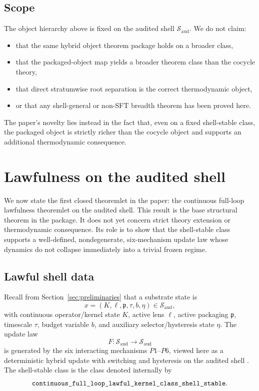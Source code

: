 \documentclass[11pt]{article}
\theoremstyle{definition}
\begin{document}
\subsection{Scope}

The object hierarchy above is fixed on the audited shell \(\mathcal{S}_{\mathrm{aud}}\). We do not claim:
\begin{itemize}
    \item that the same hybrid object theorem package holds on a broader class,
    \item that the packaged-object map yields a broader theorem class than the cocycle theory,
    \item that direct stratumwise root separation is the correct thermodynamic object,
    \item or that any shell-general or non-SFT breadth theorem has been proved here.
\end{itemize}
The paper’s novelty lies instead in the fact that, even on a fixed shell-stable class, the packaged object is strictly richer than the cocycle object and supports an additional thermodynamic consequence.
 \section{Lawfulness on the audited shell}\label{sec:lawfulness}

We now state the first closed theoremlet in the paper: the continuous full-loop lawfulness theoremlet on the audited shell. This result is the base structural theorem in the package. It does not yet concern strict theory extension or thermodynamic consequence. Its role is to show that the shell-stable class supports a well-defined, nondegenerate, six-mechanism update law whose dynamics do not collapse immediately into a trivial frozen regime.

\subsection{Lawful shell data}

Recall from Section~\ref{sec:preliminaries} that a substrate state is
\[
x=(K,\ell,\mathfrak{p},\tau,b,\eta)\in \mathcal{S}_{\mathrm{aud}},
\]
with continuous operator/kernel state \(K\), active lens \(\ell\), active packaging \(\mathfrak{p}\), timescale \(\tau\), budget variable \(b\), and auxiliary selector/hysteresis state \(\eta\). The update law
\[
F:\mathcal{S}_{\mathrm{aud}}\to \mathcal{S}_{\mathrm{aud}}
\]
is generated by the six interacting mechanisms \(P1\)--\(P6\), viewed here as a deterministic hybrid update with switching and hysteresis on the audited shell \cite{GoebelSanfeliceTeel2012Hybrid}. The shell-stable class is the class denoted internally by
\[
\texttt{continuous\_full\_loop\_lawful\_kernel\_class\_shell\allowbreak\_stable}.
\]
\end{document}
